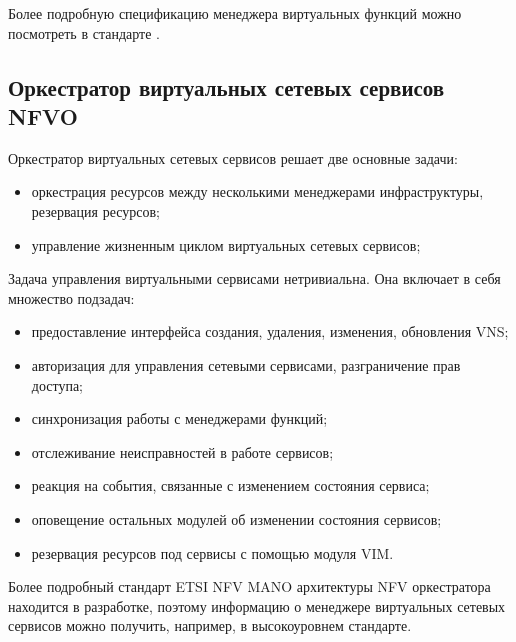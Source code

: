 \documentclass[oneside,final,14pt,a4paper]{extreport}
\begin{document}
Более подробную спецификацию менеджера виртуальных функций можно посмотреть в стандарте \cite{nfv-mano-official-2016-04}.

\subsection{Оркестратор виртуальных сетевых сервисов NFVO}
Оркестратор виртуальных сетевых сервисов решает две основные задачи:
\begin{itemize}
	\item оркестрация ресурсов между несколькими менеджерами инфраструктуры, резервация ресурсов;
	\item управление жизненным циклом виртуальных сетевых сервисов;
\end{itemize}

Задача управления виртуальными сервисами нетривиальна. Она включает в себя множество подзадач:

\begin{itemize}
	\item предоставление интерфейса создания, удаления, изменения, обновления VNS;
	\item авторизация для управления сетевыми сервисами, разграничение прав доступа;
	\item синхронизация работы с менеджерами функций;
	\item отслеживание неисправностей в работе сервисов;
	\item реакция на события, связанные с изменением состояния сервиса;
	\item оповещение остальных модулей об изменении состояния сервисов;
	\item резервация ресурсов под сервисы с помощью модуля VIM.
\end{itemize}

Более подробный стандарт ETSI NFV MANO архитектуры NFV оркестратора находится в разработке, поэтому информацию о менеджере виртуальных сетевых сервисов можно получить, например, в высокоуровнем стандарте.\cite{nfv-mano-official-2016-04}
\end{document}
